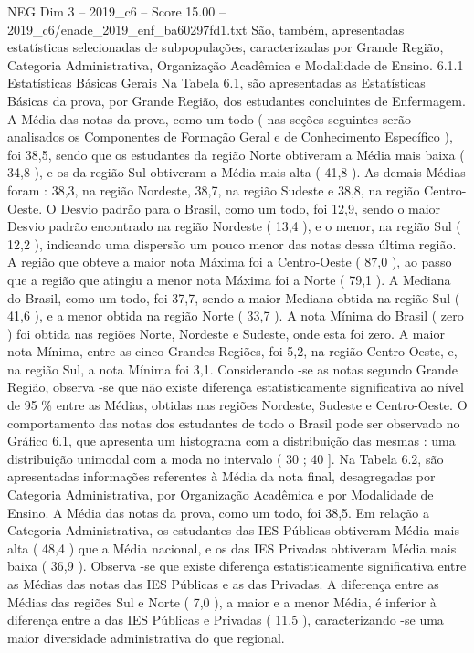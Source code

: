\begin{textsample}{NEG Dim 3 – 2019\_c6 – Score 15.00 – 2019\_c6/enade\_2019\_enf\_ba60297fd1.txt}
São, também, apresentadas estatísticas selecionadas de subpopulações, caracterizadas por Grande Região, Categoria Administrativa, Organização Acadêmica e Modalidade de Ensino. 6.1.1 Estatísticas Básicas Gerais Na Tabela 6.1, são apresentadas as Estatísticas Básicas da prova, por Grande Região, dos estudantes concluintes de Enfermagem.
A Média das notas da prova, como um todo ( nas seções seguintes serão analisados os Componentes de Formação Geral e de Conhecimento Específico ), foi 38,5, sendo que os estudantes da região Norte obtiveram a Média mais baixa ( 34,8 ), e os da região Sul obtiveram a Média mais alta ( 41,8 ).
As demais Médias foram : 38,3, na região Nordeste, 38,7, na região Sudeste e 38,8, na região Centro-Oeste.
O Desvio padrão para o Brasil, como um todo, foi 12,9, sendo o maior Desvio padrão encontrado na região Nordeste ( 13,4 ), e o menor, na região Sul ( 12,2 ), indicando uma dispersão um pouco menor das notas dessa última região.
A região que obteve a maior nota Máxima foi a Centro-Oeste ( 87,0 ), ao passo que a região que atingiu a menor nota Máxima foi a Norte ( 79,1 ).
A Mediana do Brasil, como um todo, foi 37,7, sendo a maior Mediana obtida na região Sul ( 41,6 ), e a menor obtida na região Norte ( 33,7 ).
A nota Mínima do Brasil ( zero ) foi obtida nas regiões Norte, Nordeste e Sudeste, onde esta foi zero.
A maior nota Mínima, entre as cinco Grandes Regiões, foi 5,2, na região Centro-Oeste, e, na região Sul, a nota Mínima foi 3,1.
Considerando -se as notas segundo Grande Região, observa -se que não existe diferença estatisticamente significativa ao nível de 95 \% entre as Médias, obtidas nas regiões Nordeste, Sudeste e Centro-Oeste.
O comportamento das notas dos estudantes de todo o Brasil pode ser observado no Gráfico 6.1, que apresenta um histograma com a distribuição das mesmas : uma distribuição unimodal com a moda no intervalo ( 30 ; 40 ].
Na Tabela 6.2, são apresentadas informações referentes à Média da nota final, desagregadas por Categoria Administrativa, por Organização Acadêmica e por Modalidade de Ensino.
A Média das notas da prova, como um todo, foi 38,5.
Em relação a Categoria Administrativa, os estudantes das IES Públicas obtiveram Média mais alta ( 48,4 ) que a Média nacional, e os das IES Privadas obtiveram Média mais baixa ( 36,9 ).
Observa -se que existe diferença estatisticamente significativa entre as Médias das notas das IES Públicas e as das Privadas.
A diferença entre as Médias das regiões Sul e Norte ( 7,0 ), a maior e a menor Média, é inferior à diferença entre a das IES Públicas e Privadas ( 11,5 ), caracterizando -se uma maior diversidade administrativa do que regional.

\end{textsample}
